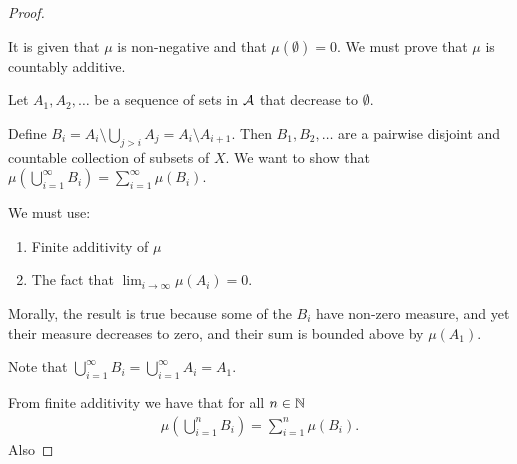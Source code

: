 \begin{proof}~\\


  It is given that $\mu$ is non-negative and that $\mu(\emptyset) = 0$. We must prove that $\mu$ is countably
  additive.

  Let $A_1, A_2, \dots$ be a sequence of sets in $\mathcal A$ that decrease to $\emptyset$.

  Define $B_i = A_i \setminus \bigcup_{j > i} A_j = A_i \setminus A_{i+1}$. Then $B_1, B_2, \dots$ are a
  pairwise disjoint and countable collection of subsets of $X$. We want to show
  that $\mu(\bigcup_{i=1}^\infty B_i) = \sum_{i=1}^\infty \mu(B_i)$.

  We must use:
  \begin{enumerate}
  \item Finite additivity of $\mu$
  \item The fact that $\lim_{i\to\infty} \mu(A_i) = 0$.
  \end{enumerate}

  Morally, the result is true because some of the $B_i$ have non-zero measure, and yet their measure decreases
  to zero, and their sum is bounded above by $\mu(A_1)$.


  Note that $\bigcup_{i=1}^\infty B_i = \bigcup_{i=1}^\infty A_i = A_1$.

  From finite additivity we have that for all $n \in \mathbb{N}$
  \begin{align*}
    \mu(\bigcup_{i=1}^n B_i) = \sum_{i=1}^n \mu(B_i).
  \end{align*}
  Also



\end{proof}



